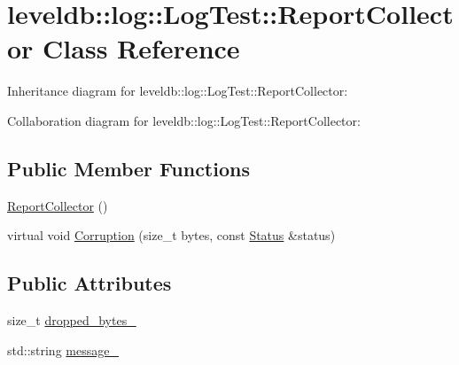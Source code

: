 \hypertarget{classleveldb_1_1log_1_1_log_test_1_1_report_collector}{\section{leveldb\-:\-:log\-:\-:Log\-Test\-:\-:Report\-Collector Class Reference}
\label{classleveldb_1_1log_1_1_log_test_1_1_report_collector}
}


Inheritance diagram for leveldb\-:\-:log\-:\-:Log\-Test\-:\-:Report\-Collector\-:


Collaboration diagram for leveldb\-:\-:log\-:\-:Log\-Test\-:\-:Report\-Collector\-:
\subsection*{Public Member Functions}
\begin{DoxyCompactItemize}
\item 
\hyperlink{classleveldb_1_1log_1_1_log_test_1_1_report_collector_abbd21b0908932f01399534ab0185a815}{Report\-Collector} ()
\item 
virtual void \hyperlink{classleveldb_1_1log_1_1_log_test_1_1_report_collector_ae78a594770acf40e6e6cc32ccab7498a}{Corruption} (size\-\_\-t bytes, const \hyperlink{classleveldb_1_1_status}{Status} \&status)
\end{DoxyCompactItemize}
\subsection*{Public Attributes}
\begin{DoxyCompactItemize}
\item 
size\-\_\-t \hyperlink{classleveldb_1_1log_1_1_log_test_1_1_report_collector_a9eac3288b67c70eb53b4694fcd1f69d6}{dropped\-\_\-bytes\-\_\-}
\item 
std\-::string \hyperlink{classleveldb_1_1log_1_1_log_test_1_1_report_collector_ad9e0030ff5a33ebad31ff94be7a649d4}{message\-\_\-}
\end{DoxyCompactItemize}


